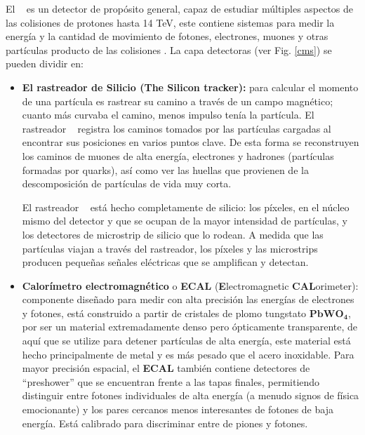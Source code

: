 El \CMS ~ es un detector de propósito general, capaz de estudiar múltiples aspectos de las colisiones de protones hasta 14 TeV, este contiene sistemas para medir la energía y la cantidad de movimiento de fotones, electrones, muones y otras partículas producto de las colisiones \citep{cms_1}. La capa detectoras (ver Fig. \ref{cms}) se pueden dividir en: 
\begin{itemize}
\item  \textbf{El rastreador de Silicio (The Silicon tracker):} para calcular el momento de una partícula es rastrear su camino a través de un campo magnético; ~ cuanto más curvaba el camino, menos impulso tenía la partícula. El rastreador \CMS ~ registra los caminos tomados por las partículas cargadas al encontrar sus posiciones en varios puntos clave. De esta forma se reconstruyen los caminos de muones de alta energía, electrones y hadrones (partículas formadas por quarks), así como ver las huellas que provienen de la descomposición de partículas de vida muy corta.

El rastreador \CMS ~ está hecho completamente de silicio: los píxeles, en el núcleo mismo del detector y que se ocupan de la mayor intensidad de partículas, y los detectores de microstrip de silicio que lo rodean. A medida que las partículas viajan a través del rastreador, los píxeles y las microstrips producen pequeñas señales eléctricas que se amplifican y detectan. %



\item \textbf{Calorímetro electromagnético} o \textbf{ECAL} (\textbf{E}lectromagnetic \textbf{CAL}orimeter): componente diseñado para medir con alta precisión las energías de electrones y fotones, está construido a partir de cristales de plomo tungstato $\mathbf{PbWO_4}$, por ser un material extremadamente denso pero ópticamente transparente, de aquí que se utilize para detener partículas de alta energía, este material está hecho principalmente de metal y es más pesado que el acero inoxidable. Para mayor precisión espacial, el \textbf{ECAL} también contiene detectores de ``preshower'' que se encuentran frente a las tapas finales, permitiendo distinguir entre fotones individuales de alta energía (a menudo signos de física emocionante) y los pares cercanos menos interesantes de fotones de baja energía. Está calibrado para discriminar entre de piones y fotones.


\end{itemize}
